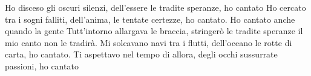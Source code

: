 \beginverse
Ho disceso gli oscuri silenzi,
dell'essere
le tradite speranze,
ho cantato
Ho cercato tra i sogni falliti,
dell'anima,
le tentate certezze,
ho cantato.
\endverse
\beginchorus
Ho cantato anche quando la gente
Tutt'intorno allargava le braccia,
stringerò le tradite speranze
il mio canto non le tradirà.
\endchorus
\beginverse
Mi solcavano navi tra i flutti,
dell'oceano
le rotte di carta,
ho cantato.
Ti aspettavo nel tempo di allora,
degli occhi
sussurrate passioni,
ho cantato
\endverse
\endsong
